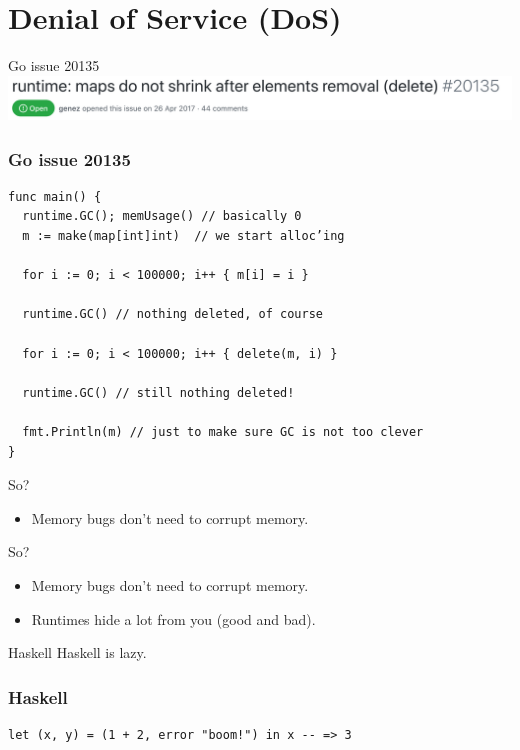 \documentclass[aspectratio=169,14pt]{beamer}
\begin{document}
  \section{Denial of Service (DoS)}
  \begin{frame}{Go issue 20135}
    \includegraphics[width=14cm]{go_20135}
  \end{frame}
  \begin{frame}[fragile]
    \frametitle{Go issue 20135}
    \begin{listing}[H]
      \caption{Go sitting on your memory.}
      \begin{verbatim}
func main() {
  runtime.GC(); memUsage() // basically 0
  m := make(map[int]int)  // we start alloc’ing

  for i := 0; i < 100000; i++ { m[i] = i }

  runtime.GC() // nothing deleted, of course

  for i := 0; i < 100000; i++ { delete(m, i) }

  runtime.GC() // still nothing deleted!

  fmt.Println(m) // just to make sure GC is not too clever
}
      \end{verbatim}
    \end{listing}
  \end{frame}
  \begin{frame}{So?}
    \begin{itemize}
      \item Memory bugs don’t need to corrupt memory.
    \end{itemize}
  \end{frame}
  \begin{frame}{So?}
    \begin{itemize}
      \item Memory bugs don’t need to corrupt memory.
      \item Runtimes hide a lot from you (good and bad).
    \end{itemize}
  \end{frame}
  \begin{frame}{Haskell}
    Haskell is lazy.
  \end{frame}
  \begin{frame}[fragile]
    \frametitle{Haskell}
    \begin{listing}[H]
      \caption{Thunks in action.}
      \begin{verbatim}
let (x, y) = (1 + 2, error "boom!") in x -- => 3
      \end{verbatim}
    \end{listing}
  \end{frame}
\end{document}
